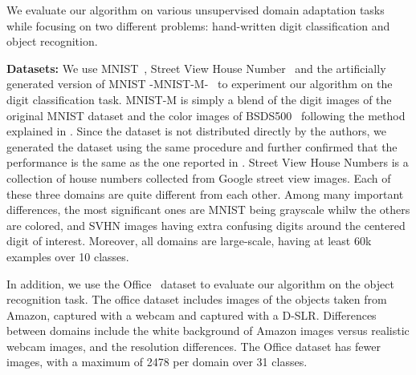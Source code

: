 We evaluate our algorithm on various unsupervised domain adaptation tasks while focusing on two different problems: hand-written digit classification and object recognition.

\vspace{2mm}
\noindent \textbf{Datasets:} We use MNIST~\cite{mnist}, Street View House Number~\cite{svhn} and the artificially generated version of MNIST -MNIST-M-~\cite{ganin15} to experiment our algorithm on the digit classification task. MNIST-M is simply a blend of the digit images of the original MNIST dataset and the color images of BSDS500~\cite{bsds500} following the method explained in \cite{ganin15}. Since the dataset is not distributed directly by the authors, we generated the dataset using the same procedure and further confirmed that the performance is the same as the one reported in \cite{ganin15}. Street View House Numbers is a collection of house numbers collected from Google street view images. Each of these three domains are quite different from each other. Among many important differences, the most significant ones are MNIST being grayscale whilw the others are colored, and SVHN images having extra confusing digits around the centered digit of interest. Moreover, all domains are large-scale, having at least 60k examples over 10 classes. 

In addition, we use the Office~\cite{office} dataset to evaluate our algorithm on the object recognition task. The office dataset includes images of the objects taken from Amazon, captured with a webcam and captured with a D-SLR. Differences between domains include the white background of Amazon images versus realistic webcam images, and the resolution differences. The Office dataset has fewer images, with a maximum of 2478 per domain over 31 classes. %

